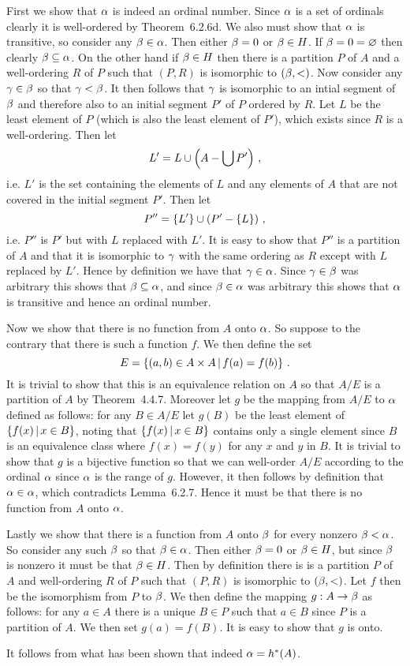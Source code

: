 \begin{solution}
    First we show that $\alpha$ is indeed an ordinal number.
    Since $\alpha$ is a set of ordinals clearly it is well-ordered by Theorem~6.2.6d.
    We also must show that $\alpha$ is transitive, so consider any $\beta \in \alpha$.
    Then either $\beta = 0$ or $\beta \in H$.
    If $\beta = 0 = \varnothing$ then clearly $\beta \subseteq \alpha$.
    On the other hand if $\beta \in H$ then there is a partition $P$ of $A$ and a well-ordering $R$ of $P$ such that $(P, R)$ is isomorphic to $(\beta, <)$.
    Now consider any $\gamma \in \beta$ so that $\gamma < \beta$.
    It then follows that $\gamma$ is isomorphic to an intial segment of $\beta$ and therefore also to an initial segment $P'$ of $P$ ordered by $R$.
    Let $L$ be the least element of $P$ (which is also the least element of $P'$), which exists since $R$ is a well-ordering.
    Then let
    $$
    L' = L \cup \left( A - \bigcup P' \right) \,,
    $$
    i.e. $L'$ is the set containing the elements of $L$ and any elements of $A$ that are not covered in the initial segment $P'$.
    Then let
    $$
    P'' = \left\{ L' \right\} \cup \left( P' - \left\{ L \right\} \right) \,,
    $$
    i.e. $P''$ is $P'$ but with $L$ replaced with $L'$.
    It is easy to show that $P''$ is a partition of $A$ and that it is isomorphic to $\gamma$ with the same ordering as $R$ except with $L$ replaced by $L'$.
    Hence by definition we have that $\gamma \in \alpha$.
    Since $\gamma \in \beta$ was arbitrary this shows that $\beta \subseteq \alpha$, and since $\beta \in \alpha$ was arbitrary this shows that $\alpha$ is transitive and hence an ordinal number.

    Now we show that there is no function from $A$ onto $\alpha$.
    So suppose to the contrary that there is such a function $f$.
    We then define the set
    $$
    E = \left\{ (a,b) \in A \times A \,|\, f(a) = f(b) \right\} \,.
    $$
    It is trivial to show that this is an equivalence relation on $A$ so that $A/E$ is a partition of $A$ by Theorem~4.4.7.
    Moreover let $g$ be the mapping from $A/E$ to $\alpha$ defined as follows: for any $B \in A/E$ let $g(B)$ be the least element of $\left\{ f(x) \,|\, x \in B \right\}$, noting that $\left\{ f(x) \,|\, x \in B \right\}$ contains only a single element since $B$ is an equivalence class where $f(x) = f(y)$ for any $x$ and $y$ in $B$.
    It is trivial to show that $g$ is a bijective function so that we can well-order $A/E$ according to the ordinal $\alpha$ since $\alpha$ is the range of $g$.
    However, it then follows by definition that $\alpha \in \alpha$, which contradicts Lemma~6.2.7.
    Hence it must be that there is no function from $A$ onto $\alpha$.

    Lastly we show that there is a function from $A$ onto $\beta$ for every nonzero $\beta < \alpha$.
    So consider any such $\beta$ so that $\beta \in \alpha$.
    Then either $\beta = 0$ or $\beta \in H$, but since $\beta$ is nonzero it must be that $\beta \in H$.
    Then by definition there is is a partition $P$ of $A$ and well-ordering $R$ of $P$ such that $(P,R)$ is isomorphic to $(\beta,<)$.
    Let $f$ then be the isomorphism from $P$ to $\beta$.
    We then define the mapping $g : A \to \beta$ as follows: for any $a \in A$ there is a unique $B \in P$ such that $a \in B$ since $P$ is a partition of $A$.
    We then set $g(a) = f(B)$.
    It is easy to show that $g$ is onto.

    It follows from what has been shown that indeed $\alpha = h^*(A)$. \qedsymbol
\end{solution}

